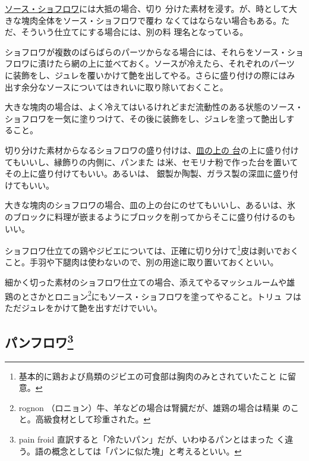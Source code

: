 

\protect\hyperlink{sauce-chaud-froid-ordinaire}{ソース・ショフロワ}には大抵の場合、切り
分けた素材を浸す。が、時として大きな塊肉全体をソース・ショフロワで覆わ
なくてはならない場合もある。ただ、そういう仕立てにする場合には、別の料
理名となっている。

ショフロワが複数のばらばらのパーツからなる場合には、それらをソース・ショ
フロワに漬けたら網の上に並べておく。ソースが冷えたら、それぞれのパーツ
に装飾をし、ジュレを覆いかけて艶を出してやる。さらに盛り付けの際にはみ
出す余分なソースについてはきれいに取り除いておくこと。

大きな塊肉の場合は、よく冷えてはいるけれどまだ流動性のある状態のソース・
ショフロワを一気に塗りつけて、その後に装飾をし、ジュレを塗って艶出しす
ること。

切り分けた素材からなるショフロワの盛り付けは、\protect\hyperlink{fonds-de-plats}{皿の上の
台}の上に盛り付けてもいいし、縁飾りの内側に、パンまた
は米、セモリナ粉で作った台を置いてその上に盛り付けてもいい。あるいは、
銀製か陶製、ガラス製の深皿に盛り付けてもいい。

大きな塊肉のショフロワの場合、皿の上の台にのせてもいいし、あるいは、氷
のブロックに料理が嵌まるようにブロックを削ってからそこに盛り付けるのも
いい。

ショフロワ仕立ての鶏やジビエについては、正確に切り分けて\footnote{基本的に鶏および鳥類のジビエの可食部は胸肉のみとされていたこと
  に留意。}皮は剥いでおく
こと。手羽や下腿肉は使わないので、別の用途に取り置いておくといい。

細かく切った素材のショフロワ仕立ての場合、添えてやるマッシュルームや雄
鶏のとさかとロニョン\footnote{rognon
  （ロニョン）牛、羊などの場合は腎臓だが、雄鶏の場合は精巣
  のこと。高級食材として珍重された。}にもソース・ショフロワを塗ってやること。トリュ
フはただジュレをかけて艶を出すだけでいい。

\hypertarget{pains-froids}{%
\subsection[パンフロワ]{\texorpdfstring{パンフロワ\footnote{pain froid
  直訳すると「冷たいパン」だが、いわゆるパンとはまった
  く違う。語の概念としては「パンに似た塊」と考えるといい。}}{パンフロワ}}\label{pains-froids}}

